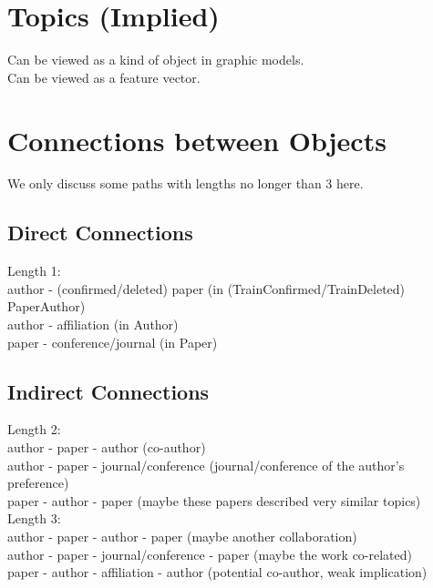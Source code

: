 \documentclass[12pt,a4paper]{article}
\begin{document}
\section{Topics (Implied)}
Can be viewed as a kind of object in graphic models.\\
Can be viewed as a feature vector.

\section{Connections between Objects}
We only discuss some paths with lengths no longer than 3 here.
\subsection{Direct Connections}
Length 1:\\
author - (confirmed/deleted) paper (in (TrainConfirmed/TrainDeleted) PaperAuthor)\\
author - affiliation (in Author)\\
paper - conference/journal (in Paper)

\subsection{Indirect Connections}
Length 2:\\
author - paper - author (co-author)\\
author - paper - journal/conference (journal/conference of the author's preference)\\
paper - author - paper (maybe these papers described very similar topics)\\
Length 3:\\
author - paper - author - paper (maybe another collaboration)\\
author - paper - journal/conference - paper (maybe the work co-related)\\
paper - author - affiliation - author (potential co-author, weak implication)
\end{document}
